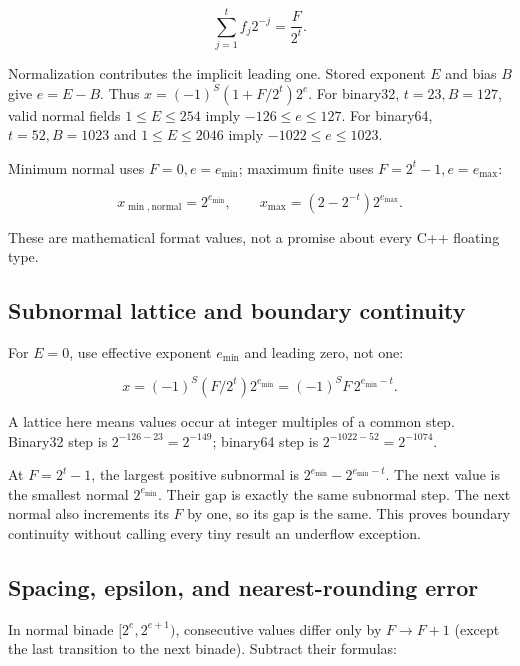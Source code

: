 \[
\sum_{j=1}^{t}f_j2^{-j}=\frac{F}{2^t}.
\]

Normalization contributes the implicit leading one. Stored exponent \(E\) and bias \(B\) give \(e=E-B\). Thus \(x=(-1)^S(1+F/2^t)2^e\). For binary32, \(t=23,B=127\), valid normal fields \(1\le E\le254\) imply \(-126\le e\le127\). For binary64, \(t=52,B=1023\) and \(1\le E\le2046\) imply \(-1022\le e\le1023\).

Minimum normal uses \(F=0,e=e_{\min}\); maximum finite uses \(F=2^t-1,e=e_{\max}\):

\[
x_{\min,\mathrm{normal}}=2^{e_{\min}},\qquad
x_{\max}=(2-2^{-t})2^{e_{\max}}.
\]

These are mathematical format values, not a promise about every C++ floating type.

\subsection{Subnormal lattice and boundary continuity}\label{01-foundations-i-ch011-subnormal-lattice-and-boundary-continuity}

\hypertarget{01-foundations-i-ch011-subnormal-lattice-and-boundary-continuity}{}

For \(E=0\), use effective exponent \(e_{\min}\) and leading zero, not one:

\[
x=(-1)^S(F/2^t)2^{e_{\min}}=(-1)^S F\,2^{e_{\min}-t}.
\]

A lattice here means values occur at integer multiples of a common step. Binary32 step is \(2^{-126-23}=2^{-149}\); binary64 step is \(2^{-1022-52}=2^{-1074}\).

At \(F=2^t-1\), the largest positive subnormal is \(2^{e_{\min}}-2^{e_{\min}-t}\). The next value is the smallest normal \(2^{e_{\min}}\). Their gap is exactly the same subnormal step. The next normal also increments its \(F\) by one, so its gap is the same. This proves boundary continuity without calling every tiny result an underflow exception.

\subsection{Spacing, epsilon, and nearest-rounding error}\label{01-foundations-i-ch011-spacing-epsilon-and-nearest-rounding-error}

\hypertarget{01-foundations-i-ch011-spacing-epsilon-and-nearest-rounding-error}{}

In normal binade \([2^e,2^{e+1})\), consecutive values differ only by \(F\to F+1\) (except the last transition to the next binade). Subtract their formulas:

